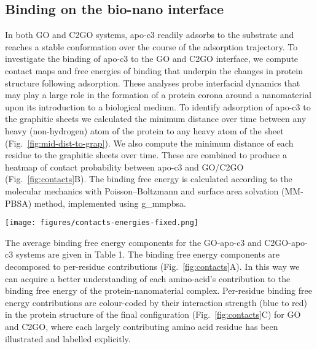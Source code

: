 \subsection{Binding on the bio-nano interface}
%
In both GO and C2GO systems, apo-c3 readily adsorbs to the substrate and reaches a stable conformation over the course of the adsorption trajectory. To investigate the binding of apo-c3 to the GO and C2GO interface, we compute contact maps and free energies of binding that underpin the changes in protein structure following adsorption. These analyses probe interfacial dynamics that may play a large role in the formation of a protein corona around a nanomaterial upon its introduction to a biological medium. To identify adsorption of apo-c3 to the graphitic sheets we calculated the minimum distance over time between any heavy (non-hydrogen) atom of the protein to any heavy atom of the sheet (Fig.~\ref{fig:mid-dist-to-grap}). We also compute the minimum distance of each residue to the graphitic sheets over time. These are combined to produce a heatmap of contact probability between apo-c3 and GO/C2GO (Fig.~\ref{fig:contacts}B). The binding free energy is calculated according to the molecular mechanics with Poisson–Boltzmann and surface area solvation (MM-PBSA) method, implemented using g\_mmpbsa.\cite{kumari2014g_mmpbsa}\\

\begin{figure*}
    \centering
    \texttt{[image: figures/contacts-energies-fixed.png]}
    \caption{MM-PBSA binding energy contributions per apo-c3 amino acid residue for GO and C2GO sheets, colour coded by magnitude (A), heat map showing contact probability of apo-c3 amino acid type with GO and C2GO functional group atoms (B) and adsorbed apo-c3 structure on GO and C2GO, protein amino acids at the graphitic interface are coloured by MM-PBSA binding energy contribution and hydrogen atoms have been omitted for clarity (C).}
    \label{fig:contacts}
\end{figure*}
%
The average binding free energy components for the GO-apo-c3 and C2GO-apo-c3 systems are given in Table 1. The binding free energy components are decomposed to per-residue contributions (Fig.~\ref{fig:contacts}A). In this way we can acquire a better understanding of each amino-acid's contribution to the binding free energy of the protein-nanomaterial complex. Per-residue binding free energy contributions are colour-coded by their interaction strength (blue to red) in the protein structure of the final configuration (Fig.~\ref{fig:contacts}C) for GO and C2GO, where each largely contributing amino acid residue has been illustrated and labelled explicitly. \\

